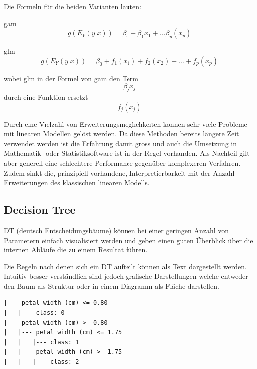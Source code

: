 \documentclass[
  12pt, %
  a4paper, %
  oneside, %
  openany, 
  numbers=noenddot, %
  BCOR=5mm, %
  parskip=half*, %
  thesis, %
]{bfhbook}
\begin{document}
\begin{center}
\begin{minipage}[t]{0.55\linewidth}
Die Formeln für die beiden Varianten lauten:

\acrshort{gam} \[g(E_Y(y|x))=\beta_0+\beta_1x_1+…\beta_p(x_p)\]

\acrshort{glm} \[g(E_Y(y|x))=\beta_0+f_1(x_1)+f_2(x_2)+…+f_p(x_p)\]

wobei \acrshort{glm} in der Formel von \acrshort{gam} den Term \[\beta_jx_j\] durch eine Funktion ersetzt \[f_j(x_j)\]
\end{minipage}
\end{center}
Durch eine Vielzahl von Erweiterungsmöglichkeiten können sehr viele Probleme mit linearen Modellen gelöst werden. Da diese Methoden bereits längere Zeit verwendet werden ist die Erfahrung damit gross und auch die Umsetzung in Mathematik- oder Statistiksoftware ist in der Regel vorhanden. Als Nachteil gilt aber generell eine schlechtere Performance gegenüber komplexeren Verfahren. Zudem sinkt die, prinzipiell vorhandene, Interpretierbarkeit mit der Anzahl Erweiterungen des klassischen linearen Modells.

\subsection{Decision Tree}
\label{DT}
\Gls{DT} (deutsch Entscheidungsbäume) können bei einer geringen Anzahl von Parametern einfach visualisiert werden und geben einen guten Überblick über die internen Abläufe die zu einem Resultat führen.
\begin{center}
\begin{minipage}[t]{0.45\linewidth}
\vspace{10pt}
Die Regeln nach denen sich ein \Gls{DT} aufteilt können als Text dargestellt werden. Intuitiv besser verständlich sind jedoch grafische Darstellungen welche entweder den Baum als Struktur oder in einem Diagramm als Fläche darstellen.
\end{minipage}\hfill
\begin{minipage}[t]{0.45\linewidth}
\begin{lstlisting}
|--- petal width (cm) <= 0.80
|   |--- class: 0
|--- petal width (cm) >  0.80
|   |--- petal width (cm) <= 1.75
|   |   |--- class: 1
|   |--- petal width (cm) >  1.75
|   |   |--- class: 2
\end{lstlisting}
\end{minipage}
\end{center}
\end{document}
